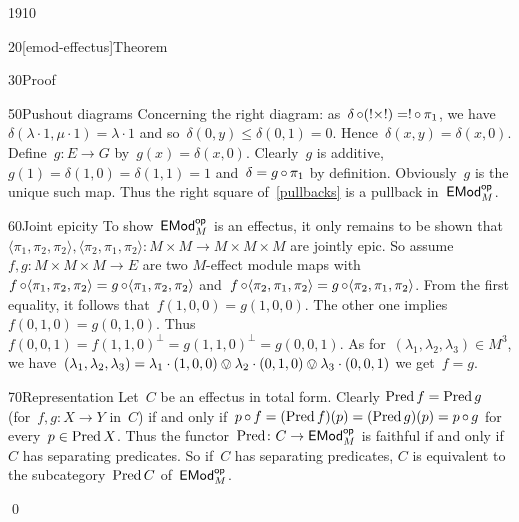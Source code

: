 \begin{parsec}{1910}
\begin{point}{20}[emod-effectus]{Theorem}
\begin{point}{30}{Proof}
\begin{point}{50}{Pushout diagrams}
Concerning the right diagram:
    as~$\delta \mathop{\circ} (!\times!) = ! \mathop{\circ} \pi_1$,
    we have~$\delta(\lambda \cdot 1, \mu \cdot 1) = \lambda \cdot 1$
    and so~$\delta(0, y) \leq \delta(0,1) = 0$.
    Hence~$\delta(x,y) = \delta(x,0)$.
Define~$g\colon E \to G$ by~$g(x) = \delta(x,0)$.
Clearly~$g$ is additive, $g(1) = \delta(1,0) = \delta(1,1) = 1$
    and~$\delta = g \mathop{\circ} \pi_1$ by definition.
Obviously~$g$ is the unique such map.
Thus the right square of~\eqref{pullbacks}
    is a pullback in~$\mathsf{EMod}_M^{\mathsf{op}}$.
\end{point}
\begin{point}{60}{Joint epicity}%
To show~$\mathsf{EMod}^{\mathsf{op}}_M$ is an effectus,
    it only remains to be shown
    that~$
    \langle \pi_1, \pi_2, \pi_2\rangle,
    \langle \pi_2, \pi_1, \pi_2\rangle\colon M \times M \to M \times M \times M
    $ are jointly epic.
So assume~$f,g\colon M \times M \times M \to E$
    are two $M$-effect module maps
    with~$
        f \mathop{\circ} \langle \pi_1,\pi_2,\pi_2\rangle =
        g \mathop{\circ} \langle \pi_1,\pi_2,\pi_2\rangle$
        and~$
        f \mathop{\circ} \langle \pi_2,\pi_1,\pi_2\rangle =
        g \mathop{\circ} \langle \pi_2,\pi_1,\pi_2\rangle$.
From the first equality, it follows that~$f(1,0,0) = g(1,0,0)$.
The other one implies~$f(0,1,0) = g(0,1,0)$.
Thus~$f(0,0,1) = f(1,1,0)^\perp = g(1,1,0)^\perp = g(0,0,1)$.
As for~$(\lambda_1,\lambda_2,\lambda_3) \in M^3$,
we have~$(\lambda_1,\lambda_2,\lambda_3)
            = \lambda_1 \cdot(1,0,0)
                \ovee \lambda_2\cdot (0,1,0)
                \ovee \lambda_3\cdot (0,0,1)$
    we get~$f=g$.
\end{point}
\begin{point}{70}{Representation}%
Let~$C$ be an effectus in total form.
Clearly $\operatorname{Pred} f = \operatorname{Pred} g $ (for~$f,g\colon X \to Y$ in~$C$)
if and only if~$p \mathop{\circ} f = (\operatorname{Pred} f)(p)= (\operatorname{Pred} g)(p) = p \mathop{\circ} g$
for every~$p \in \operatorname{Pred} X$.
Thus the functor~$\operatorname{Pred}\colon C \to \mathsf{EMod}^{\mathsf{op}}_M$
    is faithful if and only if~$C$ has separating predicates.
So if~$C$ has separating predicates,
    $C$ is equivalent to the subcategory~$\operatorname{Pred} C$
    of~$\mathsf{EMod}_M^{\mathsf{op}}$.
\end{point}
    \qed
\end{point}
\end{point}
\end{parsec}
